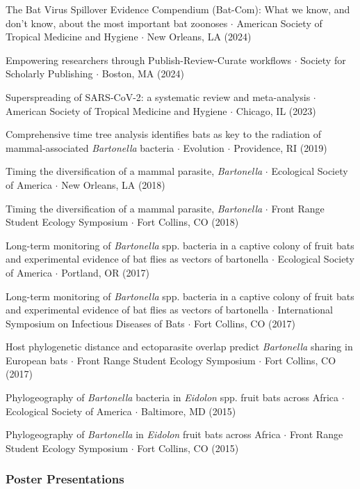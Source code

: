 \documentclass{cv}
\begin{document}
The Bat Virus Spillover Evidence Compendium (Bat-Com): What we know, and don’t know, about the most important bat zoonoses $\cdot$ American Society of Tropical Medicine and Hygiene $\cdot$ New Orleans, LA (2024)

Empowering researchers through Publish-Review-Curate workflows $\cdot$ Society for Scholarly Publishing $\cdot$ Boston, MA (2024)

Superspreading of SARS-CoV-2: a systematic review and meta-analysis $\cdot$ American Society of Tropical Medicine and Hygiene $\cdot$ Chicago, IL (2023)

Comprehensive time tree analysis identifies bats as key to the radiation of mammal-associated \textit{Bartonella} bacteria $\cdot$ Evolution $\cdot$ Providence, RI (2019)

Timing the diversification of a mammal parasite, \textit{Bartonella} $\cdot$ Ecological Society of America $\cdot$ New Orleans, LA (2018)

Timing the diversification of a mammal parasite, \textit{Bartonella} $\cdot$ Front Range Student Ecology Symposium $\cdot$ Fort Collins, CO (2018)

Long-term monitoring of \textit{Bartonella} spp. bacteria in a captive colony of fruit bats and experimental evidence of bat flies as vectors of bartonella $\cdot$ Ecological Society of America $\cdot$ Portland, OR (2017)

Long-term monitoring of \textit{Bartonella} spp. bacteria in a captive colony of fruit bats and experimental evidence of bat flies as vectors of bartonella $\cdot$ International Symposium on Infectious Diseases of Bats $\cdot$ Fort Collins, CO (2017)

Host phylogenetic distance and ectoparasite overlap predict \textit{Bartonella} sharing in European bats $\cdot$ Front Range Student Ecology Symposium $\cdot$ Fort Collins, CO (2017)

Phylogeography of \textit{Bartonella} bacteria in \textit{Eidolon} spp. fruit bats across Africa $\cdot$ Ecological Society of America $\cdot$ Baltimore, MD (2015)

Phylogeography of \textit{Bartonella} in \textit{Eidolon} fruit bats across Africa $\cdot$ Front Range Student Ecology Symposium $\cdot$ Fort Collins, CO (2015)

\subsubsection*{Poster Presentations}
\end{document}
